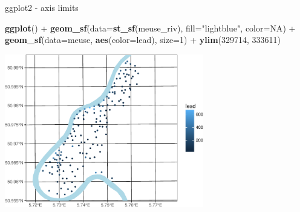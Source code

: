 \documentclass[11pt,ignorenonframetext,]{beamer}
\newenvironment{Shaded}{}{}
\newcommand{\DataTypeTok}[1]{\textcolor[rgb]{0.56,0.13,0.00}{#1}}
\newcommand{\DecValTok}[1]{\textcolor[rgb]{0.25,0.63,0.44}{#1}}
\newcommand{\KeywordTok}[1]{\textcolor[rgb]{0.00,0.44,0.13}{\textbf{#1}}}
\newcommand{\NormalTok}[1]{#1}
\newcommand{\OperatorTok}[1]{\textcolor[rgb]{0.40,0.40,0.40}{#1}}
\newcommand{\OtherTok}[1]{\textcolor[rgb]{0.00,0.44,0.13}{#1}}
\newcommand{\StringTok}[1]{\textcolor[rgb]{0.25,0.44,0.63}{#1}}
\let\oldShaded\Shaded
\let\endoldShaded\endShaded
\renewenvironment{Shaded}{\footnotesize\begin{spacing}{0.9}\oldShaded}{\endoldShaded\end{spacing}}
\let\oldverbatim\verbatim
\let\endoldverbatim\endverbatim
\newcommand{\scriptoutput}{
  \renewenvironment{Shaded}{\scriptsize\begin{spacing}{0.9}\oldShaded}{\endoldShaded\end{spacing}}
  \renewenvironment{verbatim}{\scriptsize\begin{spacing}{0.9}\oldverbatim}{\endoldverbatim\end{spacing}}
}
\begin{document}
\begin{frame}[fragile,t]{ggplot2 - axis limits}
\protect\hypertarget{ggplot2---axis-limits-1}{}

\scriptoutput

\begin{Shaded}
\begin{Highlighting}[]
\KeywordTok{ggplot}\NormalTok{() }\OperatorTok{+}
\StringTok{  }\KeywordTok{geom_sf}\NormalTok{(}\DataTypeTok{data=}\KeywordTok{st_sf}\NormalTok{(meuse_riv), }\DataTypeTok{fill=}\StringTok{"lightblue"}\NormalTok{, }\DataTypeTok{color=}\OtherTok{NA}\NormalTok{) }\OperatorTok{+}
\StringTok{  }\KeywordTok{geom_sf}\NormalTok{(}\DataTypeTok{data=}\NormalTok{meuse, }\KeywordTok{aes}\NormalTok{(}\DataTypeTok{color=}\NormalTok{lead), }\DataTypeTok{size=}\DecValTok{1}\NormalTok{) }\OperatorTok{+}
\StringTok{  }\KeywordTok{ylim}\NormalTok{(}\DecValTok{329714}\NormalTok{, }\DecValTok{333611}\NormalTok{)}
\end{Highlighting}
\end{Shaded}

\begin{center}\includegraphics[width=0.65\textwidth]{Lec16_files/figure-beamer/unnamed-chunk-15-1} \end{center}

\end{frame}
\end{document}
